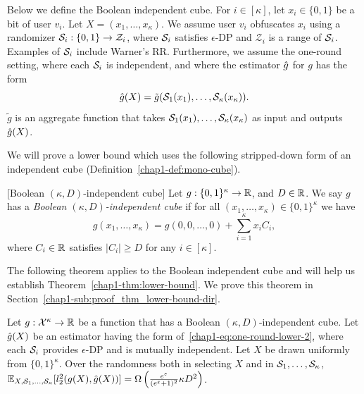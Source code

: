 {Below we define the Boolean independent cube. 
For $i\in[\kappa]$, let $x_i \in \{0,1\}$ be a bit of user $v_i$. 
Let $X = (x_1, \ldots, x_\kappa)$. 
We assume user $v_i$ 
obfuscates $x_i$ using 
a randomizer
$\mathcal{S}_i : \{0,1\} \rightarrow \mathcal{Z}_i$, where $\mathcal{S}_i$ 
satisfies $\epsilon$-DP and $\mathcal{Z}_i$ is a range of $\mathcal{S}_i$. 
Examples of $\mathcal{S}_i$ include Warner's RR. 
Furthermore, we assume the one-round setting, where each $\mathcal{S}_i$ is independent, 
and where the estimator $\hat{g}$ for $g$ has the form
\begin{equation}\label{chap1-eq:one-round-lower-2}
  \hat{g}(X) = \tilde{g}(\mathcal{S}_1(x_1), \ldots, \mathcal{S}_\kappa(x_\kappa)).
\end{equation}
$\tilde{g}$ is an aggregate function that takes $\mathcal{S}_1(x_1), \ldots, \mathcal{S}_\kappa(x_\kappa)$ as input and outputs $\hat{g}(X)$. 

We will prove a lower bound which uses the following stripped-down form of an independent cube (Definition~\ref{chap1-def:mono-cube}).
\begin{definition}\label{chap1-def:mono-cube-boolean}[Boolean $(\kappa,D)$-independent cube]
  Let $g : \{0,1\}^\kappa \rightarrow \mathbb{R}$, and $D \in \mathbb{R}$.
  We say 
  $g$ has 
  a \emph{Boolean $(\kappa,D)$-independent cube} 
  if for all
  $(x_1, \ldots, x_\kappa) \in \{0,1\}^\kappa$ we have 
  \[
    g(x_1, \ldots, x_\kappa) = g(0,0,\ldots,0) + \sum_{i=1}^\kappa x_i C_i,
  \]
  where $C_i \in \mathbb{R}$ satisfies $|C_i| \geq D$ for any $i \in [\kappa]$.
\end{definition}

The following theorem applies to 
the Boolean independent cube 
and will help us establish
Theorem~\ref{chap1-thm:lower-bound}. We prove this theorem in
Section~\ref{chap1-sub:proof_thm_lower-bound-dir}.
\begin{theorem}\label{chap1-thm:lower-bound-dir}
  Let $g : \mathcal{X}^{\kappa} \rightarrow \mathbb{R}$ be a function 
  that has 
  a Boolean
  $(\kappa,D)$-independent cube. 
  Let $\hat{g}(X)$ be an estimator having the form
  of~\eqref{chap1-eq:one-round-lower-2}, where 
  each $\mathcal{S}_i$ %
  provides $\epsilon$-DP and 
  is 
  mutually 
  independent. 
  Let $X$ be drawn uniformly from
  $\{0,1\}^\kappa$. 
  Over the randomness both in selecting $X$ and in 
  $\mathcal{S}_1, \ldots, \mathcal{S}_\kappa$, 
  $\mathbb{E}_{X, \mathcal{S}_1, \ldots, \mathcal{S}_\kappa}[l_2^2(g(X), \hat{g}(X))] =
  \Omega\left(\frac{e^\varepsilon}{(e^\varepsilon+1)^2} \kappa D^2\right)$.
\end{theorem}

}
